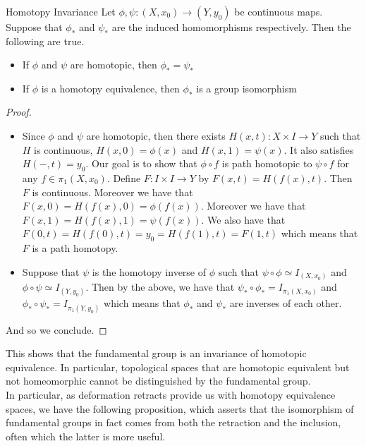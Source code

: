 \documentclass[a4paper]{article}
\begin{document}
\begin{thm}{Homotopy Invariance}{} Let $\phi,\psi:(X,x_0)\to(Y,y_0)$ be continuous maps. Suppose that $\phi_\ast$ and $\psi_\ast$ are the induced homomorphisms respectively. Then the following are true. 
\begin{itemize}
\item If $\phi$ and $\psi$ are homotopic, then $\phi_\ast=\psi_\ast$
\item If $\phi$ is a homotopy equivalence, then $\phi_\ast$ is a group isomorphism
\end{itemize} 
\begin{proof}~\\
\begin{itemize}
\item Since $\phi$ and $\psi$ are homotopic, then there exists $H(x,t):X\times I\to Y$ such that $H$ is continuous, $H(x,0)=\phi(x)$ and $H(x,1)=\psi(x)$. It also satisfies $H(-,t)=y_0$. Our goal is to show that $\phi\circ f$ is path homotopic to $\psi\circ f$ for any $f\in\pi_1(X,x_0)$. Define $F:I\times I\to Y$ by $F(x,t)=H(f(x),t)$. Then $F$ is continuous. Moreover we have that $F(x,0)=H(f(x),0)=\phi(f(x))$. Moreover we have that $F(x,1)=H(f(x),1)=\psi(f(x))$. We also have that $F(0,t)=H(f(0),t)=y_0=H(f(1),t)=F(1,t)$ which means that $F$ is a path homotopy. 
\item Suppose that $\psi$ is the homotopy inverse of $\phi$ such that $\psi\circ\phi\simeq I_{(X,x_0)}$ and $\phi\circ\psi\simeq I_{(Y,y_0)}$. Then by the above, we have that $\psi_\ast\circ\phi_\ast=I_{\pi_1(X,x_0)}$ and $\phi_\ast\circ\psi_\ast=I_{\pi_1(Y,y_0)}$ which means that $\phi_\ast$ and $\psi_\ast$ are inverses of each other. 
\end{itemize}
And so we conclude. 
\end{proof}
\end{thm}

This shows that the fundamental group is an invariance of homotopic equivalence. In particular, topological spaces that are homotopic equivalent but not homeomorphic cannot be distinguished by the fundamental group. \\

In particular, as deformation retracts provide us with homotopy equivalence spaces, we have the following proposition, which asserts that the isomorphism of fundamental groups in fact comes from both the retraction and the inclusion, often which the latter is more useful. 
\end{document}
